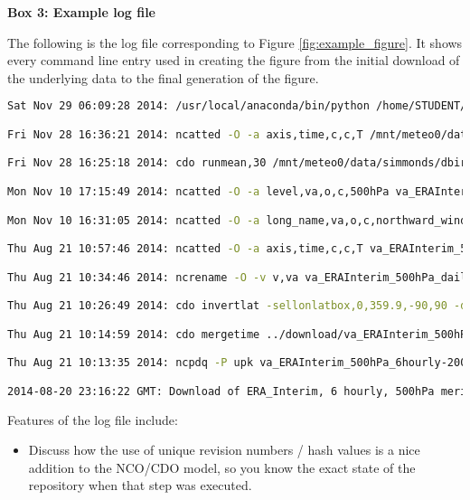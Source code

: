 \textbf{Box 3: Example log file}

The following is the log file corresponding to Figure \ref{fig:example_figure}. It shows every command line entry used in creating the figure from the initial download of the underlying data to the final generation of the figure.  

\begin{lstlisting}[language=bash] 
Sat Nov 29 06:09:28 2014: /usr/local/anaconda/bin/python /home/STUDENT/dbirving/phd/visualisation/plot_hilbert.py /mnt/meteo0/data/simmonds/dbirving/ERAInterim/data/va_ERAInterim_500hPa_030day-runmean_native.nc va hilbert_zw3_w19_va_ERAInterim_500hPa_030day-runmean_native-55S_1986-05-22_2006-07-29.png 1 2 --latitude -55 --dates 1986-05-22 2006-07-29 --wavenumbers 1 9 --figure_size 15 6 (Git hash: 8a42fff) 

Fri Nov 28 16:36:21 2014: ncatted -O -a axis,time,c,c,T /mnt/meteo0/data/simmonds/dbirving/ERAInterim/data/va_ERAInterim_500hPa_030day-runmean_native.nc

Fri Nov 28 16:25:18 2014: cdo runmean,30 /mnt/meteo0/data/simmonds/dbirving/ERAInterim/data/va_ERAInterim_500hPa_daily_native.nc /mnt/meteo0/data/simmonds/dbirving/ERAInterim/data/va_ERAInterim_500hPa_030day-runmean_native.nc

Mon Nov 10 17:15:49 2014: ncatted -O -a level,va,o,c,500hPa va_ERAInterim_500hPa_daily_native.nc

Mon Nov 10 16:31:05 2014: ncatted -O -a long_name,va,o,c,northward_wind va_ERAInterim_500hPa_daily_native.nc

Thu Aug 21 10:57:46 2014: ncatted -O -a axis,time,c,c,T va_ERAInterim_500hPa_daily_native.nc

Thu Aug 21 10:34:46 2014: ncrename -O -v v,va va_ERAInterim_500hPa_daily_native.nc

Thu Aug 21 10:26:49 2014: cdo invertlat -sellonlatbox,0,359.9,-90,90 -daymean va_ERAInterim_500hPa_6hourly_native.nc va_ERAInterim_500hPa_daily_native.nc

Thu Aug 21 10:14:59 2014: cdo mergetime ../download/va_ERAInterim_500hPa_6hourly-1979-1988_native_unpacked.nc ../download/va_ERAInterim_500hPa_6hourly-1989-1998_native_unpacked.nc ../download/va_ERAInterim_500hPa_6hourly-1999-2008_native_unpacked.nc ../download/va_ERAInterim_500hPa_6hourly-2009-2014_native_unpacked.nc va_ERAInterim_500hPa_6hourly_native.nc 

Thu Aug 21 10:13:35 2014: ncpdq -P upk va_ERAInterim_500hPa_6hourly-2009-2014_native.nc va_ERAInterim_500hPa_6hourly-2009-2014_native_unpacked.nc

2014-08-20 23:16:22 GMT: Download of ERA_Interim, 6 hourly, 500hPa meridional wind (va) data. 
\end{lstlisting}

Features of the log file include:
\begin{itemize}
\item Discuss how the use of unique revision numbers / hash values is a nice addition to the NCO/CDO model, so you know the exact state of the repository when that step was executed.
\end{itemize}
